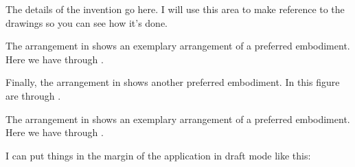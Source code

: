 

\npar The details of the invention go here. I will use this area to make reference to the drawings so you can see how it's done. 

\npar The arrangement in  shows an exemplary arrangement of a preferred embodiment. Here we have     through . 

\npar Finally, the arrangement in  shows another preferred embodiment. In this figure are   through .

\npar The arrangement in  shows an exemplary arrangement of a preferred embodiment. Here we have      through .

\npar I can put things in the margin of the application in draft mode like this: 

